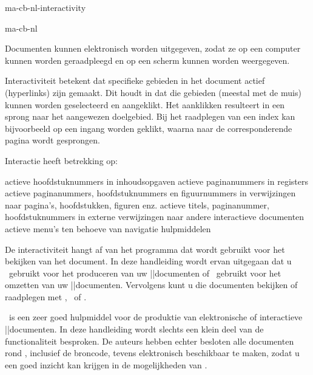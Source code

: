 \startonderdeel ma-cb-nl-interactivity

\produkt ma-cb-nl



\index[reader]{\READER}
\index[exchange]{\EXCHANGE}
\index[distiller]{\DISTILLER}

Documenten kunnen elektronisch worden uitgegeven, zodat ze
op een computer kunnen worden geraadpleegd en op een scherm
kunnen worden weergegeven.

Interactiviteit betekent dat specifieke gebieden in het
document actief (hyperlinks) zijn gemaakt. Dit houdt in dat
die gebieden (meestal met de muis) kunnen worden
geselecteerd en aangeklikt. Het aanklikken resulteert in een
sprong naar het aangewezen doelgebied. Bij het raadplegen
van een index kan bijvoorbeeld op een ingang worden geklikt,
waarna naar de corresponderende pagina wordt gesprongen.

Interactie heeft betrekking op:

\startopsomming[opelkaar]
\som actieve hoofdstuknummers in inhoudsopgaven
\som actieve paginanummers in registers
\som actieve paginanummers, hoofdstuknummers en
     figuurnummers in verwijzingen naar pagina's,
     hoofdstukken, figuren enz.
\som actieve titels, paginanummer, hoofdstuknummers in
     externe verwijzingen naar andere interactieve
     documenten
\som actieve menu's ten behoeve van navigatie hulpmiddelen
\stopopsomming

De interactiviteit hangt af van het programma dat wordt
gebruikt voor het bekijken van het document. In deze
handleiding wordt ervan uitgegaan dat u \PDFTEX\ gebruikt
voor het produceren van uw \PDF||documenten of \DISTILLER\
gebruikt voor het omzetten van uw \POSTSCRIPT||documenten.
Vervolgens kunt u die documenten bekijken of raadplegen met
\READER, \EXCHANGE\ of \GHOSTVIEW.

\CONTEXT\ is een zeer goed hulpmiddel voor de produktie van
elektronische of interactieve \PDF||documenten. In deze
handleiding wordt slechts een klein deel van de
functionaliteit besproken. De auteurs hebben echter besloten
alle documenten rond \CONTEXT, inclusief de broncode, tevens
elektronisch beschikbaar te maken, zodat u een goed inzicht
kan krijgen in de mogelijkheden van \CONTEXT.




